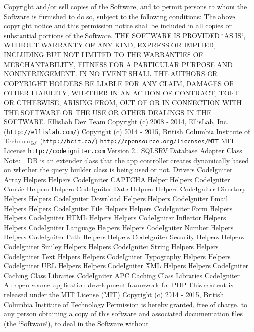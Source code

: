 \begin{DoxyCopyright}{Copyright}
and/or sell copies of the Software, and to permit persons to whom the Software is furnished to do so, subject to the following conditions\+: The above copyright notice and this permission notice shall be included in all copies or substantial portions of the Software. T\+H\+E S\+O\+F\+T\+W\+A\+R\+E I\+S P\+R\+O\+V\+I\+D\+E\+D \char`\"{}\+A\+S I\+S\char`\"{}, W\+I\+T\+H\+O\+U\+T W\+A\+R\+R\+A\+N\+T\+Y O\+F A\+N\+Y K\+I\+N\+D, E\+X\+P\+R\+E\+S\+S O\+R I\+M\+P\+L\+I\+E\+D, I\+N\+C\+L\+U\+D\+I\+N\+G B\+U\+T N\+O\+T L\+I\+M\+I\+T\+E\+D T\+O T\+H\+E W\+A\+R\+R\+A\+N\+T\+I\+E\+S O\+F M\+E\+R\+C\+H\+A\+N\+T\+A\+B\+I\+L\+I\+T\+Y, F\+I\+T\+N\+E\+S\+S F\+O\+R A P\+A\+R\+T\+I\+C\+U\+L\+A\+R P\+U\+R\+P\+O\+S\+E A\+N\+D N\+O\+N\+I\+N\+F\+R\+I\+N\+G\+E\+M\+E\+N\+T. I\+N N\+O E\+V\+E\+N\+T S\+H\+A\+L\+L T\+H\+E A\+U\+T\+H\+O\+R\+S O\+R C\+O\+P\+Y\+R\+I\+G\+H\+T H\+O\+L\+D\+E\+R\+S B\+E L\+I\+A\+B\+L\+E F\+O\+R A\+N\+Y C\+L\+A\+I\+M, D\+A\+M\+A\+G\+E\+S O\+R O\+T\+H\+E\+R L\+I\+A\+B\+I\+L\+I\+T\+Y, W\+H\+E\+T\+H\+E\+R I\+N A\+N A\+C\+T\+I\+O\+N O\+F C\+O\+N\+T\+R\+A\+C\+T, T\+O\+R\+T O\+R O\+T\+H\+E\+R\+W\+I\+S\+E, A\+R\+I\+S\+I\+N\+G F\+R\+O\+M, O\+U\+T O\+F O\+R I\+N C\+O\+N\+N\+E\+C\+T\+I\+O\+N W\+I\+T\+H T\+H\+E S\+O\+F\+T\+W\+A\+R\+E O\+R T\+H\+E U\+S\+E O\+R O\+T\+H\+E\+R D\+E\+A\+L\+I\+N\+G\+S I\+N T\+H\+E S\+O\+F\+T\+W\+A\+R\+E.  Ellis\+Lab Dev Team  Copyright (c) 2008 -\/ 2014, Ellis\+Lab, Inc. (\href{http://ellislab.com/}{\tt http\+://ellislab.\+com/})  Copyright (c) 2014 -\/ 2015, British Columbia Institute of Technology (\href{http://bcit.ca/}{\tt http\+://bcit.\+ca/})  \href{http://opensource.org/licenses/MIT}{\tt http\+://opensource.\+org/licenses/\+M\+I\+T} M\+I\+T License  \href{http://codeigniter.com}{\tt http\+://codeigniter.\+com}  Version 2..  S\+Q\+L\+S\+R\+V Database Adapter Class Note\+: \+\_\+\+D\+B is an extender class that the app controller creates dynamically based on whether the query builder class is being used or not.  Drivers Code\+Igniter Array Helpers  Helpers Code\+Igniter C\+A\+P\+T\+C\+H\+A Helper  Helpers Code\+Igniter Cookie Helpers  Helpers Code\+Igniter Date Helpers  Helpers Code\+Igniter Directory Helpers  Helpers Code\+Igniter Download Helpers  Helpers Code\+Igniter Email Helpers  Helpers Code\+Igniter File Helpers  Helpers Code\+Igniter Form Helpers  Helpers Code\+Igniter H\+T\+M\+L Helpers  Helpers Code\+Igniter Inflector Helpers  Helpers Code\+Igniter Language Helpers  Helpers Code\+Igniter Number Helpers  Helpers Code\+Igniter Path Helpers  Helpers Code\+Igniter Security Helpers  Helpers Code\+Igniter Smiley Helpers  Helpers Code\+Igniter String Helpers  Helpers Code\+Igniter Text Helpers  Helpers Code\+Igniter Typography Helpers  Helpers Code\+Igniter U\+R\+L Helpers  Helpers Code\+Igniter X\+M\+L Helpers  Helpers Code\+Igniter Caching Class  Libraries Code\+Igniter A\+P\+C Caching Class  Libraries Code\+Igniter An open source application development framework for P\+H\+P This content is released under the M\+I\+T License (M\+I\+T) Copyright (c) 2014 -\/ 2015, British Columbia Institute of Technology Permission is hereby granted, free of charge, to any person obtaining a copy of this software and associated documentation files (the \char`\"{}\+Software\char`\"{}), to deal in the Software without 
\end{DoxyCopyright}
